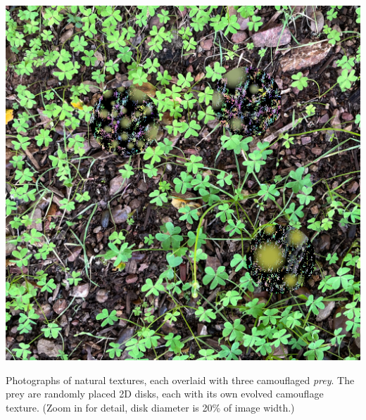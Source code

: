 \documentclass[acmtog]{acmart}
\begin{document}
\begin{teaserfigure}
    \hfill
    \includegraphics[scale=0.24]{20221216_step_5997.png}
    \caption{Photographs of natural textures, each overlaid with three camouflaged \textit{prey}. The prey are randomly placed 2D disks, each with its own evolved camouflage texture. (Zoom in for detail, disk diameter is 20\% of image width.) }
    \label{fig:teaser}
    \vspace{3mm} %
\end{teaserfigure}

\maketitle

\end{document}
